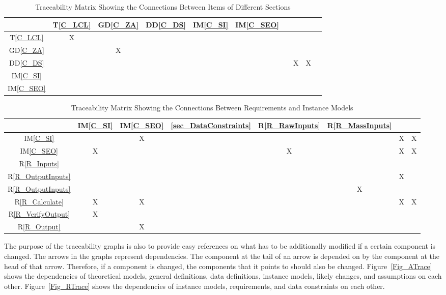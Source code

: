 \documentclass[12pt]{article}
\newcommand{\dref}[1]{GD\ref{#1}}
\newcommand{\ddref}[1]{DD\ref{#1}}
\newcommand{\tref}[1]{T\ref{#1}}
\newcommand{\iref}[1]{IM\ref{#1}}
\newcommand{\rref}[1]{R\ref{#1}}
\begin{document}
\begin{table}[h!]
\centering
\begin{tabular}{|c|c|c|c|c|c|c|c|c|c|}
\hline        
	& \tref{C_LCL}& \dref{C_ZA} & \ddref{C_DS}& \iref{C_SI} &\iref{C_SEO} \\
\hline
\tref{C_LCL}        & X& & & & & & & &  \\ \hline
\dref{C_ZA}           & & X& & & & & &  \\ \hline
\ddref{C_DS}    & & & & & & & X& X&\\ \hline
\iref{C_SI}         & & & & & & & & &  \\ \hline
\iref{C_SEO}        & & & & & & & & & \\ \hline


\hline
\end{tabular}
\caption{Traceability Matrix Showing the Connections Between Items of Different Sections}
\label{Table:trace}
\end{table}

\begin{table}[h!]
\centering
\begin{tabular}{|c|c|c|c|c|c|c|c|}
\hline
	& \iref{C_SI}& \iref{C_SEO}& \ref{sec_DataConstraints}& \rref{R_RawInputs}& \rref{R_MassInputs} \\
\hline
\iref{C_SI}            & & X& & & & X& X \\ \hline
\iref{C_SEO}            & X& & & X& & X& X \\ \hline
\rref{R_Inputs}     & & & & & & & \\ \hline
\rref{R_OutputInputs}    & & & & & & X& \\ \hline
\rref{R_OutputInputs}   & & & & & X& & \\ \hline
\rref{R_Calculate}  & X& X& & & & X& X \\ \hline
\rref{R_VerifyOutput}     & X& & & & & & \\ \hline 
\rref{R_Output}       & & X& & & & & \\ \hline
\hline
\end{tabular}
\caption{Traceability Matrix Showing the Connections Between Requirements and Instance Models}
\label{Table:R_trace}
\end{table}

The purpose of the traceability graphs is also to provide easy references on
what has to be additionally modified if a certain component is changed.  The
arrows in the graphs represent dependencies. The component at the tail of an
arrow is depended on by the component at the head of that arrow. Therefore, if a
component is changed, the components that it points to should also be
changed. Figure~\ref{Fig_ATrace} shows the dependencies of theoretical models,
general definitions, data definitions, instance models, likely changes, and
assumptions on each other. Figure~\ref{Fig_RTrace} shows the dependencies of
instance models, requirements, and data constraints on each other.
\end{document}
